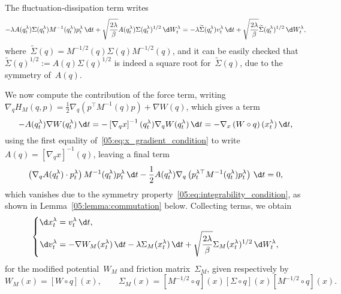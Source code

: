 The fluctuation-dissipation term writes
\begin{equation}
    -\lambda A(q_t^\lambda)\Sigma(q_t^\lambda)M^{-1}(q_t^\lambda)p_t^\lambda\,\d t + \sqrt{\frac{2\lambda}{\beta}}A(q_t^\lambda)\Sigma(q_t^\lambda)^{1/2}\,\d W_t^\lambda = -\lambda \widetilde{\Sigma}(q_t^\lambda)v_t^\lambda \,\d t+ \sqrt{\frac{2\lambda}{\beta}}\widetilde{\Sigma}(q_t^\lambda)^{1/2}\,\d W_t^\lambda,
\end{equation}
where~$\widetilde{\Sigma}(q) = M^{-1/2}(q)\Sigma(q)M^{-1/2}(q)$, and it can be easily checked that~$\widetilde{\Sigma}(q)^{1/2}:=A(q)\Sigma(q)^{1/2}$ is indeed a square root for~$\widetilde{\Sigma}(q)$, due to the symmetry of~$A(q)$.

We now compute the contribution of the force term, writing~$\nabla_q H_M(q,p) = \frac12 \nabla_q\left(p^\top M^{-1}(q)p\right) + \nabla W(q)$, which gives a term
\begin{equation}
    -A(q_t^\lambda)\nabla W(q_t^\lambda)\,\d t = -\left[\nabla_q x\right]^{-1}(q_t^\lambda)\nabla_q W(q_t^\lambda)\,\d t = -\nabla_x\left(W\circ q\right)(x_t^\lambda)\,\d t,
\end{equation}
using the first equality of~\eqref{05:eq:x_gradient_condition} to write~$A(q) = \left[\nabla_q x\right]^{-1}(q)$, leaving a final term
\begin{equation}
    \left(\nabla_q A(q_t^\lambda)\cdot p_t^\lambda\right)M^{-1}(q_t^\lambda)p_t^\lambda\,\d t - \frac12 A(q_t^\lambda)\nabla_q\left(p_t^{\lambda\top} M^{-1}(q_t^\lambda)p_t^\lambda\right)\,\d t=0,
\end{equation}
which vanishes due to the symmetry property~\eqref{05:eq:integrability_condition}, as shown in Lemma~\ref{05:lemma:commutation} below. Collecting terms, we obtain
\begin{equation}
    \label{05:eq:final_equation}
    \left\{\begin{aligned}
    \d x_t^\lambda &= v_t^\lambda\,\d t,\\
    \d v_t^\lambda &= -\nabla W_M(x_t^\lambda)\,\d t - \lambda\Sigma_M(x_t^\lambda)\,\d t + \sqrt{\frac{2\lambda}{\beta}}\Sigma_M(x_t^\lambda)^{1/2}\,\d W_t^\lambda,
    \end{aligned}\right.
\end{equation}
for the modified potential~$W_M$ and friction matrix~$\Sigma_M$, given respectively by
\begin{equation}
    \label{05:eq:modified_coefficients}
    W_M(x) = \left[W\circ q\right](x),\qquad \Sigma_M(x) = \left[M^{-1/2}\circ q\right](x)\left[\Sigma\circ q\right](x) \left[M^{-1/2}\circ q\right](x).
\end{equation}
